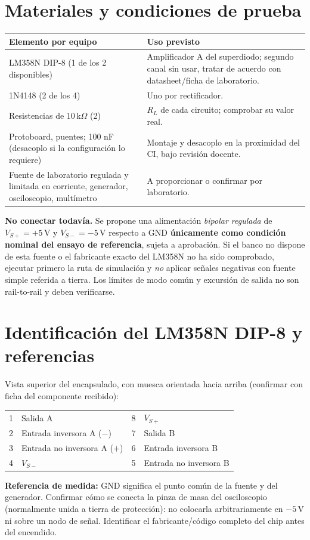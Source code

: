 \documentclass[10pt,a4paper]{article}
\begin{document}
\section{Materiales y condiciones de prueba}
\begin{tabularx}{\linewidth}{@{}P{3.2cm}Y@{}}\toprule
Elemento por equipo & Uso previsto \\ \midrule
LM358N DIP-8 (1 de los 2 disponibles) & Amplificador A del superdiodo; segundo canal sin usar, tratar de acuerdo con datasheet/ficha de laboratorio.\\
1N4148 (2 de los 4) & Uno por rectificador.\\
Resistencias de $10\,\mathrm{k}\Omega$ (2) & $R_L$ de cada circuito; comprobar su valor real.\\
Protoboard, puentes; 100 nF (desacoplo si la configuración lo requiere) & Montaje y desacoplo en la proximidad del CI, bajo revisión docente.\\
Fuente de laboratorio regulada y limitada en corriente, generador, osciloscopio, multímetro & A proporcionar o confirmar por laboratorio. \\ \bottomrule\end{tabularx}
\begin{caution}\textbf{No conectar todavía.} Se propone una alimentación \emph{bipolar regulada} de $V_{S+}=+5\,\mathrm{V}$ y $V_{S-}=-5\,\mathrm{V}$ respecto a GND \textbf{únicamente como condición nominal del ensayo de referencia}, sujeta a aprobación. Si el banco no dispone de esta fuente o el fabricante exacto del LM358N no ha sido comprobado, ejecutar primero la ruta de simulación y \emph{no} aplicar señales negativas con fuente simple referida a tierra. Los límites de modo común y excursión de salida no son rail-to-rail y deben verificarse.\end{caution}
\section{Identificación del LM358N DIP-8 y referencias}
Vista superior del encapsulado, con muesca orientada hacia arriba (confirmar con ficha del componente recibido):
\begin{center}\begin{tabular}{@{}cl|cl@{}}\toprule 1 & Salida A & 8 & $V_{S+}$ \\2 & Entrada inversora A ($-$) & 7 & Salida B \\3 & Entrada no inversora A ($+$) & 6 & Entrada inversora B \\4 & $V_{S-}$ & 5 & Entrada no inversora B \\ \bottomrule\end{tabular}\end{center}
\textbf{Referencia de medida:} GND significa el punto común de la fuente y del generador. Confirmar cómo se conecta la pinza de masa del osciloscopio (normalmente unida a tierra de protección): no colocarla arbitrariamente en $-5\,\mathrm{V}$ ni sobre un nodo de señal. Identificar el fabricante/código completo del chip antes del encendido.
\end{document}
